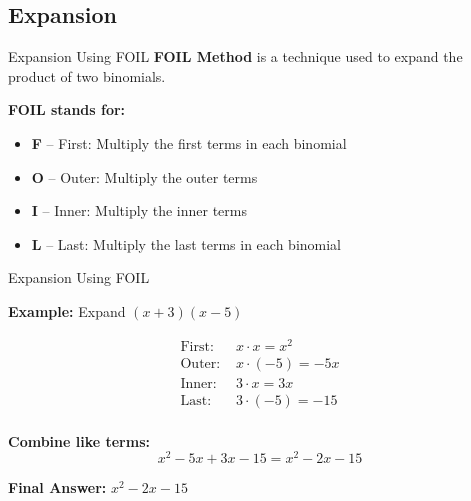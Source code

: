 \documentclass{beamer}
\begin{document}
\begin{frame}
\section{Expansion}
\end{frame}

\begin{frame}{Expansion Using FOIL}
\small
\textbf{FOIL Method} is a technique used to expand the product of two binomials.

\vspace{0.2cm}
\textbf{FOIL stands for:}
\begin{itemize}
    \item \textbf{F} – First: Multiply the first terms in each binomial
    \item \textbf{O} – Outer: Multiply the outer terms
    \item \textbf{I} – Inner: Multiply the inner terms
    \item \textbf{L} – Last: Multiply the last terms in each binomial
\end{itemize}

\end{frame}


\begin{frame}{Expansion Using FOIL}
    

\textbf{Example:} Expand $(x + 3)(x - 5)$

\[
\begin{aligned}
\text{First: } & x \cdot x = x^2 \\
\text{Outer: } & x \cdot (-5) = -5x \\
\text{Inner: } & 3 \cdot x = 3x \\
\text{Last: } & 3 \cdot (-5) = -15 \\
\end{aligned}
\]




\textbf{Combine like terms:}
\[
x^2 - 5x + 3x - 15 = x^2 - 2x - 15
\]


\textbf{Final Answer:} $x^2 - 2x - 15$
\end{frame}
\end{document}
